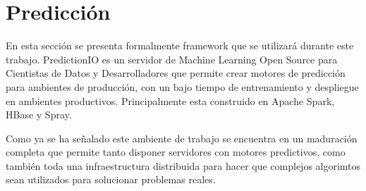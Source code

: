 

\section{Predicción }

  	
  En esta sección se presenta formalmente framework que se utilizará durante este trabajo. %
  PredictionIO es un servidor de Machine Learning Open Source para Cientistas de Datos y Desarrolladores que permite crear motores de predicción para ambientes de producción, con un bajo tiempo de entrenamiento y despliegue en ambientes productivos. Principalmente esta construido en Apache Spark, HBase y Spray.

  Como ya se ha señalado este ambiente de trabajo se encuentra en un maduración completa que permite tanto disponer  servidores con motores predictivos, como también toda una infraestructura distribuida para hacer que complejos algorimtos sean utilizados para solucionar problemas reales.














